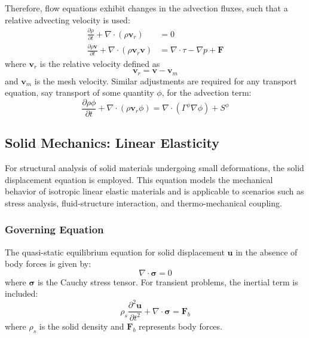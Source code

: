 \documentclass[12pt]{extarticle}
\newcommand{\<}{\langle}
\renewcommand{\>}{\rangle}
\theoremstyle{definition}
\begin{document}
Therefore, flow equations exhibit changes in the advection fluxes, such that a relative advecting velocity is used:
\begin{align}
\frac{\partial \rho}{\partial t} + \nabla \cdot (\rho \textbf{v}_{r}) &= 0 \label{eq:cont_full_def} \\
\frac{\partial \rho \textbf{v}}{\partial t} + \nabla \cdot (\rho \textbf{v}_{r} \textbf{v}) &= \nabla \cdot \tau - \nabla p + \textbf{F}\label{eq:mom_full_def}
\end{align}
where $\textbf{v}_r$ is the relative velocity defined as
\begin{equation}
    \textbf{v}_r = \textbf{v} - \textbf{v}_m
\end{equation}
and $\textbf{v}_m$ is the mesh velocity. Similar adjustments are required for any transport equation, say transport of some quantity $\phi$, for the advection term:
\begin{equation}
    \frac{\partial \rho \phi}{\partial t} + \nabla \cdot (\rho \textbf{v}_{r} \phi) = \nabla \cdot \left(\Gamma^{\phi} \nabla \phi \right) + S^{\phi}\label{eq:sca_eq_def}
\end{equation}

\subsection{Solid Mechanics: Linear Elasticity}

For structural analysis of solid materials undergoing small deformations, the solid displacement equation is employed. This equation models the mechanical behavior of isotropic linear elastic materials and is applicable to scenarios such as stress analysis, fluid-structure interaction, and thermo-mechanical coupling.

\subsubsection{Governing Equation}

The quasi-static equilibrium equation for solid displacement $\textbf{u}$ in the absence of body forces is given by:
\begin{equation}
    \nabla \cdot \boldsymbol{\sigma} = 0 \label{eq:equilibrium}
\end{equation}
where $\boldsymbol{\sigma}$ is the Cauchy stress tensor. For transient problems, the inertial term is included:
\begin{equation}
    \rho_s \frac{\partial^2 \textbf{u}}{\partial t^2} + \nabla \cdot \boldsymbol{\sigma} = \textbf{F}_b \label{eq:solid_transient}
\end{equation}
where $\rho_s$ is the solid density and $\textbf{F}_b$ represents body forces.
\end{document}
